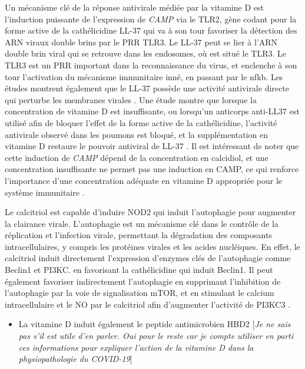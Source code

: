 \documentclass[
  a4paper,
  DIV=11,
  numbers=noendperiod,
  listof=totoc]{scrreprt}
\providecommand{\tightlist}{%
  \setlength{\itemsep}{0pt}\setlength{\parskip}{0pt}}\usepackage{longtable,booktabs,array}
\begin{document}
Un mécanisme clé de la réponse antivirale médiée par la vitamine D est
l'induction puissante de l'expression de \emph{CAMP} via le TLR2, gène
codant pour la forme active de la cathélicidine LL-37 qui va à son tour
favoriser la détection des ARN viraux double brins par le \ac{PRR} TLR3.
Le LL-37 peut se lier à l'ARN double brin viral qui se retrouve dans les
endosomes, où est situé le TLR3. Le TLR3 est un \ac{PRR} important dans
la reconnaissance du virus, et enclenche à son tour l'activation du
mécanisme immunitaire inné, en passant par le \ac{nfkb}. Les études
montrent également que le LL-37 possède une activité antivirale directe
qui perturbe les membranes virales \autocite{Bishop.2021}. Une étude
montre que lorsque la concentration de vitamine D est insuffisante, ou
lorsqu'un anticorps anti-LL37 est utilisé afin de bloquer l'effet de la
forme active de la cathélicidine, l'activité antivirale observé dans les
poumons est bloqué, et la supplémentation en vitamine D restaure le
pouvoir antiviral de LL-37 \autocite{Buonfiglio.2017}. Il est
intéressant de noter que cette induction de \emph{CAMP} dépend de la
concentration en calcidiol, et une concentration insuffisante ne permet
pas une induction en CAMP, ce qui renforce l'importance d'une
concentration adéquate en vitamine D appropriée pour le système
immunitaire \autocite{White.2022}.

Le calcitriol est capable d'induire NOD2 qui induit l'autophagie pour
augmenter la clairance virale. L'autophagie est un mécanisme clé dans le
contrôle de la réplication et l'infection virale, permettant la
dégradation des composants intracellulaires, y compris les protéines
virales et les acides nucléiques. En effet, le calcitriol induit
directement l'expression d'enzymes clés de l'autophagie comme Beclin1 et
PI3KC. en favorisant la cathélicidine qui induit Beclin1. Il peut
également favoriser indirectement l'autophagie en supprimant
l'inhibition de l'autophagie par la voie de signalisation mTOR, et en
stimulant le calcium intracellulaire et le \ac{NO} par le calcitriol
afin d'augmenter l'activité de PI3KC3 \autocite{Bishop.2021}.

\begin{itemize}
\tightlist
\item
  La vitamine D induit également le peptide antimicrobien HBD2
  {[}\emph{Je ne sais pas s'il est utile d'en parler. Oui pour le reste
  car je compte utiliser en parti ces informations pour expliquer
  l'action de la vitamine D dans la physiopathologie du COVID-19}{]}
\end{itemize}
\end{document}

